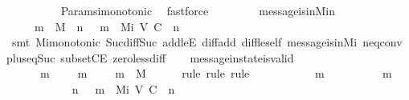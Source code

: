 \begin{isabellebody}
\ \ \ \ \ \ \ \ \isamarkupfalse%
\ Params{\isachardot}{\isasymSigma}i{\isacharunderscore}monotonic\ \isamarkupfalse%
\ fastforce\isanewline
\ \ \ \ \isamarkupfalse%
%
\endisatagproof
{\isafoldproof}%
%
\isadelimproof
\isanewline
%
\endisadelimproof
\isanewline
\ \ \isamarkupfalse%
\ message{\isacharunderscore}is{\isacharunderscore}in{\isacharunderscore}M{\isacharunderscore}i{\isacharunderscore}n\ {\isacharcolon}\isanewline
\ \ \ \ {\isachardoublequoteopen}{\isasymforall}\ m\ {\isasymin}\ M{\isachardot}\ {\isasymexists}\ n\ {\isasymin}\ {\isasymnat}{\isachardot}\ m\ {\isasymin}\ M{\isacharunderscore}i\ {\isacharparenleft}V{\isacharcomma}\ C{\isacharcomma}\ {\isasymepsilon}{\isacharparenright}\ n{\isachardoublequoteclose}\isanewline
%
\isadelimproof
\ \ \ \ %
\endisadelimproof
%
\isatagproof
{}\isamarkupfalse%
\ {\isacharparenleft}smt\ Mi{\isacharunderscore}monotonic\ Suc{\isacharunderscore}diff{\isacharunderscore}Suc\ add{\isacharunderscore}leE\ diff{\isacharunderscore}add\ diff{\isacharunderscore}le{\isacharunderscore}self\ message{\isacharunderscore}is{\isacharunderscore}in{\isacharunderscore}M{\isacharunderscore}i\ neq{}{\isacharunderscore}conv\ plus{\isacharunderscore}{}{\isacharunderscore}eq{\isacharunderscore}Suc\ subsetCE\ zero{\isacharunderscore}less{\isacharunderscore}diff{\isacharparenright}%
\endisatagproof
{\isafoldproof}%
%
\isadelimproof
\isanewline
%
\endisadelimproof
\isanewline
\ \ \isamarkupfalse%
\ message{\isacharunderscore}in{\isacharunderscore}state{\isacharunderscore}is{\isacharunderscore}valid\ {\isacharcolon}\isanewline
\ \ \ \ {\isachardoublequoteopen}{\isasymforall}\ {\isasymsigma}\ m{\isachardot}\ {\isasymsigma}\ {\isasymin}\ {\isasymSigma}\ {\isasymand}\ m\ {\isasymin}\ {\isasymsigma}\ {\isasymlongrightarrow}\ \ m\ {\isasymin}\ M{\isachardoublequoteclose}\isanewline
%
\isadelimproof
\ \ \ \ %
\endisadelimproof
%
\isatagproof
{}\isamarkupfalse%
\ {\isacharparenleft}rule{\isacharcomma}\ rule{\isacharcomma}\ rule{\isacharparenright}\isanewline
\ \ \isamarkupfalse%
\ {\isacharminus}\isanewline
\ \ \ \ \isamarkupfalse%
\ {\isasymsigma}\ m\isanewline
\ \ \ \ \isamarkupfalse%
\ {\isachardoublequoteopen}{\isasymsigma}\ {\isasymin}\ {\isasymSigma}\ {\isasymand}\ m\ {\isasymin}\ {\isasymsigma}{\isachardoublequoteclose}\isanewline
\ \ \ \ \isamarkupfalse%
\isanewline
\ \ \ \ \ \ {\isachardoublequoteopen}{\isasymexists}\ n\ {\isasymin}\ {\isasymnat}{\isachardot}\ m\ {\isasymin}\ M{\isacharunderscore}i\ {\isacharparenleft}V{\isacharcomma}\ C{\isacharcomma}\ {\isasymepsilon}{\isacharparenright}\ n\isanewline

\end{isabellebody}
